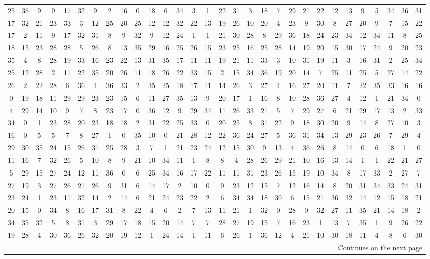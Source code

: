 \documentclass[11pt,twoside]{article}
\numberwithin{Theorem}{section}
\numberwithin{Definition}{section}
\numberwithin{Lemma}{section}
\numberwithin{Algorithm}{section}
\numberwithin{equation}{section}
\begin{document}
\begin{table}
\begin{tabular}{|*{30}{c|}}
25 &36 &9 &9 &17 &32 &9 &2 &16 &0 &18 &6 &34 &3 &1&22 &31 &3 &18 &7 &29 &21 &22 &12 &13 &9 &5 &34 &36 &31\\
17 &32 &21 &23 &33 &3 &12 &25 &20 &25 &12 &12 &32 &22 &13&19 &26 &10 &20 &4 &23 &9 &30 &8 &27 &20 &9 &7 &15 &22\\
17 &2 &11 &9 &17 &32 &31 &8 &9 &32 &9 &12 &24 &1 &1&21 &30 &28 &8 &29 &36 &18 &24 &23 &34 &12 &34 &11 &8 &25\\
18 &15 &23 &28 &28 &5 &26 &8 &13 &35 &29 &16 &25 &26 &15&23 &25 &16 &25 &28 &14 &19 &20 &15 &30 &17 &24 &9 &20 &23\\
35 &4 &8 &28 &19 &33 &16 &23 &22 &13 &31 &35 &17 &11 &11&19 &21 &11 &33 &3 &10 &31 &19 &11 &3 &16 &31 &2 &25 &34\\
25 &12 &28 &2 &11 &22 &35 &20 &26 &11 &18 &26 &22 &33 &15&2 &15 &34 &36 &19 &20 &14 &7 &25 &11 &25 &5 &27 &14 &22\\
26 &2 &22 &28 &6 &36 &4 &36 &33 &2 &35 &25 &18 &17 &11&14 &26 &3 &27 &4 &16 &27 &20 &11 &7 &22 &35 &33 &16 &16\\
0 &19 &18 &11 &29 &29 &23 &23 &15 &6 &11 &27 &35 &13 &9&20 &17 &1 &16 &8 &10 &28 &36 &27 &4 &12 &1 &21 &34 &0\\
4 &29 &14 &10 &9 &7 &8 &23 &17 &0 &36 &12 &9 &29 &34&11 &26 &33 &21 &5 &7 &29 &27 &6 &21 &29 &17 &13 &2 &33\\
34 &0 &1 &23 &28 &20 &23 &18 &18 &2 &31 &22 &25 &33 &0&20 &25 &8 &31 &22 &9 &18 &30 &20 &9 &14 &8 &27 &10 &3\\
16 &0 &5 &5 &7 &8 &27 &1 &0 &35 &10 &0 &21 &28 &12&22 &36 &24 &27 &5 &36 &31 &34 &13 &29 &23 &26 &7 &29 &4\\
29 &30 &35 &24 &15 &26 &31 &25 &28 &3 &7 &1 &21 &23 &24&12 &15 &30 &9 &13 &4 &36 &26 &8 &14 &0 &6 &18 &1 &0\\
11 &16 &7 &32 &26 &5 &10 &8 &9 &21 &10 &34 &11 &1 &8&8 &4 &28 &26 &29 &21 &10 &16 &13 &14 &1 &1 &22 &21 &27\\
5 &29 &15 &27 &24 &12 &11 &36 &0 &6 &25 &34 &16 &17 &22&11 &11 &31 &23 &26 &15 &19 &10 &34 &8 &17 &33 &2 &27 &7\\
27 &19 &3 &27 &26 &21 &26 &9 &31 &6 &14 &17 &2 &10 &0&9 &23 &12 &15 &7 &12 &16 &14 &8 &20 &31 &34 &33 &24 &31\\
23 &24 &1 &23 &11 &32 &14 &2 &14 &6 &21 &24 &23 &22 &2&6 &34 &34 &18 &30 &6 &15 &21 &36 &32 &14 &12 &15 &18 &21\\
20 &15 &0 &34 &8 &16 &17 &31 &8 &22 &4 &6 &2 &7 &13&11 &21 &1 &32 &0 &28 &0 &32 &27 &11 &35 &21 &14 &18 &2\\
34 &35 &32 &5 &8 &31 &3 &29 &17 &18 &15 &20 &14 &7 &7&28 &27 &19 &15 &7 &16 &23 &1 &13 &7 &35 &1 &9 &26 &22\\
19 &28 &4 &30 &36 &26 &32 &20 &19 &12 &1 &24 &14 &1 &11&6 &26 &1 &36 &12 &4 &21 &10 &30 &18 &11 &4 &8 &6 &30\\
  \hline
    \multicolumn{30}{r}{Continues on the next page} \\
      \end{tabular}
\end{table}
\end{document}
